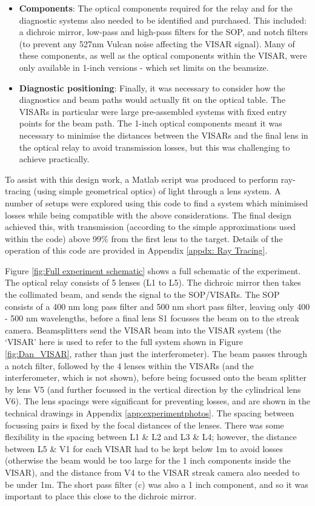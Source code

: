 \begin{itemize}
    \item\textbf{Components}: The optical components required for the relay and for the diagnostic systems also needed to be identified and purchased. This included: a dichroic mirror, low-pass and high-pass filters for the SOP, and notch filters (to prevent any 527nm Vulcan noise affecting the VISAR signal). Many of these components, as well as the optical components within the VISAR, were only available in 1-inch versions - which set limits on the beamsize.
    
    \item \textbf{Diagnostic positioning}: Finally, it was necessary to consider how the diagnostics and beam paths would actually fit on the optical table. The VISARs in particular were large pre-assembled systems with fixed entry points for the beam path. The 1-inch optical components meant it was necessary to minimise the distances between the VISARs and the final lens in the optical relay to avoid transmission losses, but this was challenging to achieve practically.
    
\end{itemize}

To assist with this design work, a Matlab script was produced to perform ray-tracing (using simple geometrical optics) of light through a lens system. A number of setups were explored using this code to find a system which minimised losses while being compatible with the above considerations. The final design achieved this, with transmission (according to the simple approximations used within the code) above 99\% from the first lens to the target. Details of the operation of this code are provided in Appendix \ref{appdx: Ray Tracing}.

Figure \ref{fig:Full experiment schematic} shows a full schematic of the experiment. The optical relay consists of 5 lenses (L1 to L5). The dichroic mirror then takes the collimated beam, and sends the signal to the SOP/VISARs. The SOP consists of a 400 nm long pass filter and 500 nm short pass filter, leaving only 400 - 500 nm wavelengths, before a final lens S1 focusses the beam on to the streak camera. Beamsplitters send the VISAR beam into the VISAR system (the `VISAR' here is used to refer to the full system shown in Figure \ref{fig:Dan_VISAR}, rather than just the interferometer). The beam passes through a notch filter, followed by the 4 lenses within the VISARs (and the interferometer, which is not shown), before being focussed onto the beam splitter by lens V5 (and further focussed in the vertical direction by the cylindrical lens V6). The lens spacings were significant for preventing losses, and are shown in the technical drawings in Appendix \ref{app:experimentphotos}. The spacing between focussing pairs is fixed by the focal distances of the lenses. There was some flexibility in the spacing between L1 \& L2 and L3 \& L4; however, the distance between L5 \& V1 for each VISAR had to be kept below 1m to avoid losses (otherwise the beam would be too large for the 1 inch components inside the VISAR), and the distance from V4 to the VISAR streak camera also needed to be under 1m. The short pass filter (c) was also a 1 inch component, and so it was important to place this close to the dichroic mirror.

